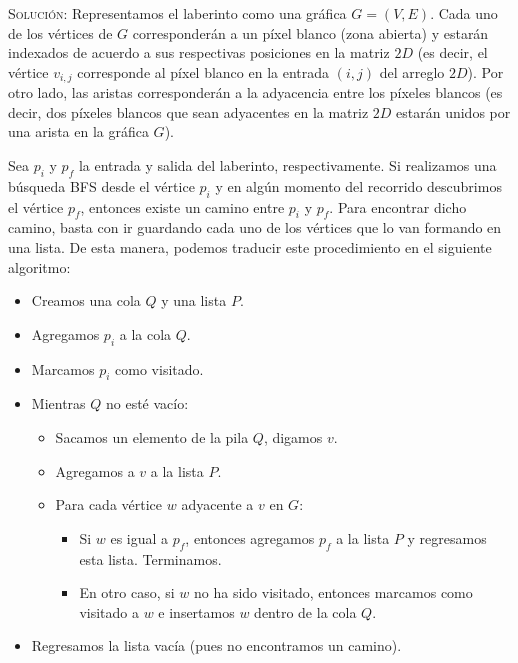 \documentclass[letterpaper,11pt]{article}
\begin{document}
\begin{enumerate}
    \textsc{Solución:} Representamos el laberinto como una gráfica $G = (V, E)$.
    Cada uno de los vértices de $G$ corresponderán a un píxel blanco (zona 
    abierta) y estarán indexados de acuerdo a sus respectivas posiciones en la 
    matriz $2D$ (es decir, el vértice $v_{i,j}$ corresponde al píxel blanco en 
    la entrada $(i,j)$ del arreglo $2D$). Por otro lado, las aristas 
    corresponderán a la adyacencia entre los píxeles blancos (es decir, dos
    píxeles blancos que sean adyacentes en la matriz $2D$ estarán unidos por
    una arista en la gráfica $G$).

    Sea $p_i$ y $p_f$ la entrada y salida del laberinto, respectivamente. 
    Si realizamos una búsqueda BFS desde el vértice $p_i$ y en algún momento 
    del recorrido descubrimos el vértice $p_f$, entonces existe un camino entre 
    $p_i$ y $p_f$. Para encontrar dicho camino, basta con ir guardando cada uno 
    de los vértices que lo van formando en una lista. De esta manera, podemos 
    traducir este procedimiento en el 
    siguiente algoritmo:
    \begin{itemize}
        \item Creamos una cola $Q$ y una lista $P$.
        \item Agregamos $p_i$ a la cola $Q$.
        \item Marcamos $p_i$ como visitado.
        \item Mientras $Q$ no esté vacío:
        \begin{itemize}
            \item Sacamos un elemento de la pila $Q$, digamos $v$.
            \item Agregamos a $v$ a la lista $P$.
            \item Para cada vértice $w$ adyacente a $v$ en $G$:
            \begin{itemize}
                \item Si $w$ es igual a $p_f$, entonces agregamos $p_f$ a la 
                lista $P$ y regresamos esta lista. Terminamos.
                \item En otro caso, si $w$ no ha sido visitado, entonces 
                marcamos como visitado a $w$ e insertamos $w$ dentro de la 
                cola $Q$.
            \end{itemize}
        \end{itemize}

        \item Regresamos la lista vacía (pues no encontramos un camino).
    \end{itemize}


\end{enumerate}
\end{document}

